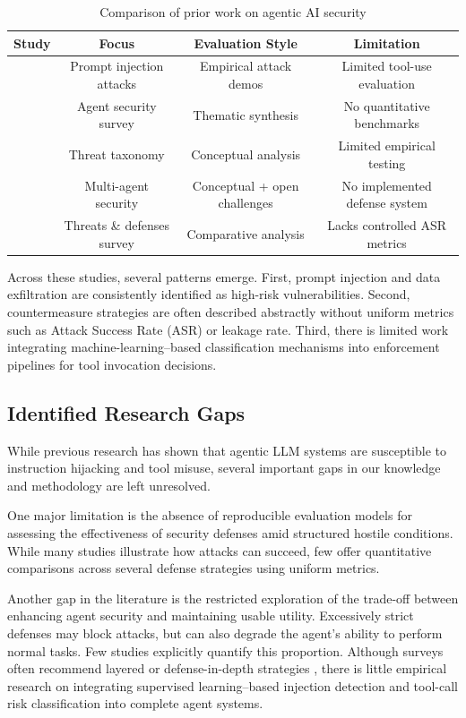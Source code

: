 \documentclass[11pt]{article}
\begin{document}
\begin{table}[H]
\centering
\begin{tabular}{lccc}
\toprule
Study & Focus & Evaluation Style & Limitation \\
\midrule
\cite{greshake2023prompt} & Prompt injection attacks & Empirical attack demos & Limited tool-use evaluation \\
\cite{deng2025agentsurvey} & Agent security survey & Thematic synthesis & No quantitative benchmarks \\
\cite{khan2024agenticthreats} & Threat taxonomy & Conceptual analysis & Limited empirical testing \\
\cite{schroeder2025multiagent} & Multi-agent security & Conceptual + open challenges & No implemented defense system \\
\cite{chhabra2026agenticsecurity} & Threats \& defenses survey & Comparative analysis & Lacks controlled ASR metrics \\
\bottomrule
\end{tabular}
\caption{Comparison of prior work on agentic AI security}
\label{tab:relatedwork}
\end{table}

Across these studies, several patterns emerge. First, prompt injection and data exfiltration are consistently identified as high-risk vulnerabilities. Second, countermeasure strategies are often described abstractly without uniform metrics such as Attack Success Rate (ASR) or leakage rate. Third, there is limited work integrating machine-learning--based classification mechanisms into enforcement pipelines for tool invocation decisions.

\subsection{Identified Research Gaps}
While previous research has shown that agentic LLM systems are susceptible to instruction hijacking and tool misuse, several important gaps in our knowledge and methodology are left unresolved. 

One major limitation is the absence of reproducible evaluation models for assessing the effectiveness of security defenses amid structured hostile conditions. While many studies illustrate how attacks can succeed, few offer quantitative comparisons across several defense strategies using uniform metrics. 

Another gap in the literature is the restricted exploration of the trade-off between enhancing agent security and maintaining usable utility. Excessively strict defenses may block attacks, but can also degrade the agent's ability to perform normal tasks. Few studies explicitly quantify this proportion. Although surveys often recommend layered or defense-in-depth strategies \cite{chhabra2026agenticsecurity, deng2025agentsurvey}, there is little empirical research on integrating supervised learning--based injection detection and tool-call risk classification into complete agent systems.
\end{document}
